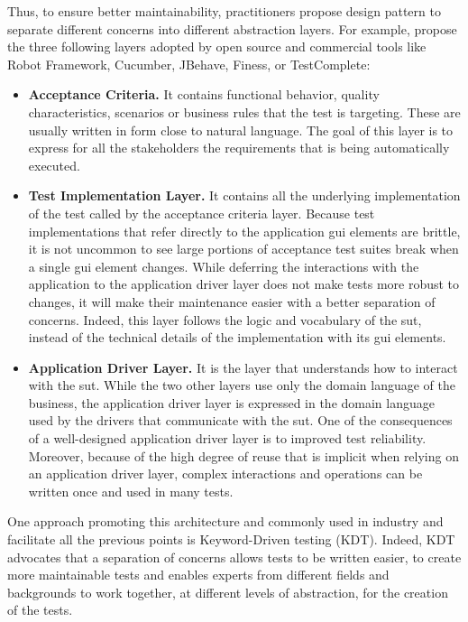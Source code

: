 Thus, to ensure better maintainability, practitioners propose design pattern to separate different concerns into different abstraction layers. For example, \textcite{Humble2010} propose the three following layers adopted by open source and commercial tools like Robot Framework, Cucumber, JBehave, Finess, or TestComplete:

\begin{itemize}
    \item \textbf{Acceptance Criteria.} It contains functional behavior, quality characteristics, scenarios or business rules that the test is targeting. These are usually written in form close to natural language. The goal of this layer is to express for all the stakeholders the requirements that is being automatically executed.
    
    \item \textbf{Test Implementation Layer.} It contains all the underlying implementation of the test called by the acceptance criteria layer. Because test implementations that refer directly to the application \gls{gui} elements are brittle, it is not uncommon to see large portions of acceptance test suites break when a single \gls{gui} element changes. While deferring the interactions with the application to the application driver layer does not make tests more robust to changes, it will make their maintenance easier with a better separation of concerns. Indeed, this layer follows the logic and vocabulary of the \gls{sut}, instead of the technical details of the implementation with its \gls{gui} elements.
    
    \item \textbf{Application Driver Layer.} It is the layer that understands how to interact with the \gls{sut}. While the two other layers use only the domain language of the business, the application driver layer is expressed in the domain language used by the drivers that communicate with the \gls{sut}. One of the consequences of a well-designed application driver layer is to improved test reliability. Moreover, because of the high degree of reuse that is implicit when relying on an application driver layer, complex interactions and operations can be written once and used in many tests.

\end{itemize}

One approach promoting this architecture and commonly used in industry and facilitate all the previous points is Keyword-Driven testing (KDT). Indeed, KDT advocates that a separation of concerns allows tests to be written easier, to create more maintainable tests and enables experts from different fields and backgrounds to work together, at different levels of abstraction, for the creation of the tests.

